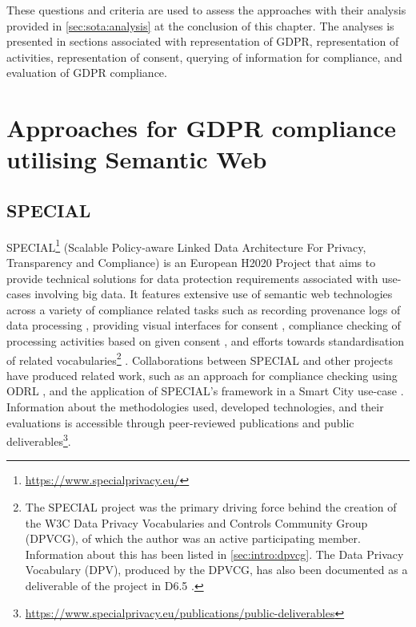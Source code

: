 These questions and criteria are used to assess the approaches with their analysis provided in \autoref{sec:sota:analysis} at the conclusion of this chapter.
The analyses is presented in sections associated with representation of GDPR, representation of activities, representation of consent, querying of information for compliance, and evaluation of GDPR compliance.

\section{Approaches for GDPR compliance utilising Semantic Web}\label{sec:sota:gdpr-semweb}

\subsection*{SPECIAL}\label{sec:sota:SPECIAL}
SPECIAL\footnote{\url{https://www.specialprivacy.eu/}} (Scalable Policy-aware Linked Data Architecture For Privacy, Transparency and Compliance) is an European H2020 Project that aims to provide technical solutions for data protection requirements associated with use-cases involving big data. It features extensive use of semantic web technologies across a variety of compliance related tasks such as recording provenance logs of data processing \cite{kirrane_scalable_2018}, providing visual interfaces for consent \cite{drozd_consent_2019,gritzalis_i_2019}, compliance checking of processing activities based on given consent \cite{westphal_spirit_2018,vos_odrl_2019,fernandez_user_2019}, and efforts towards standardisation of related vocabularies\footnote{The SPECIAL project was the primary driving force behind the creation of the W3C Data Privacy Vocabularies and Controls Community Group (DPVCG), of which the author was an active participating member. Information about this has been listed in \autoref{sec:intro:dpvcg}. The Data Privacy Vocabulary (DPV), produced by the DPVCG, has also been documented as a deliverable of the project in D6.5 \cite{pandit_d6.5_2019}.} \cite{bonatti_data_2018,pandit_creating_2019}.
Collaborations between SPECIAL and other projects have produced related work, such as an approach for compliance checking using ODRL \cite{agarwal_legislative_2018,vos_odrl_2019}, and the application of SPECIAL's framework in a Smart City use-case \cite{fernandez_user_2019}.
Information about the methodologies used, developed technologies, and their evaluations is accessible through peer-reviewed publications and public deliverables\footnote{\url{https://www.specialprivacy.eu/publications/public-deliverables}}.


